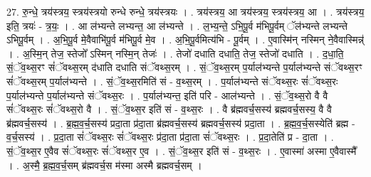 \documentclass[17pt]{extarticle}
\begin{document}
27. रु॒न्धे॒ त्रय॑स्त्रय॒ स्त्रय॑स्त्रयो रुन्धे रुन्धे॒ त्रय॑स्त्रयः । . त्रय॑स्त्रय॒ आ त्रय॑स्त्रय॒ स्त्रय॑स्त्रय॒ आ । . त्रय॑स्त्रय॒ इति॒ त्रयः॑ - त्र॒यः॒ । . आ ल॑भ्यन्ते लभ्यन्त॒ आ ल॑भ्यन्ते । . ल॒भ्य॒न्ते॒ ऽभि॒पू॒र्व म॑भिपू॒र्वम् ॅल॑भ्यन्ते लभ्यन्ते ऽभिपू॒र्वम् । . अ॒भि॒पू॒र्व मे॒वैवाभि॑पू॒र्व म॑भिपू॒र्व मे॒व । . अ॒भि॒पू॒र्वमित्य॑भि - पू॒र्वम् । . ए॒वास्मि॑न् नस्मिन् ने॒वैवास्मिन्न्॑ । . अ॒स्मि॒न् तेज॒ स्तेजो᳚ ऽस्मिन् नस्मि॒न् तेजः॑ । . तेजो॑ दधाति दधाति॒ तेज॒ स्तेजो॑ दधाति । . द॒धा॒ति॒ सं॒ॅव॒थ्स॒रꣳ सं॑ॅवथ्स॒रम् द॑धाति दधाति संॅवथ्स॒रम् । . सं॒ॅव॒थ्स॒रम् प॒र्याल॑भ्यन्ते प॒र्याल॑भ्यन्ते संॅवथ्स॒रꣳ सं॑ॅवथ्स॒रम् प॒र्याल॑भ्यन्ते । . सं॒ॅव॒थ्स॒रमिति॑ सं - व॒थ्स॒रम् । . प॒र्याल॑भ्यन्ते संॅवथ्स॒रः सं॑ॅवथ्स॒रः प॒र्याल॑भ्यन्ते प॒र्याल॑भ्यन्ते संॅवथ्स॒रः । . प॒र्याल॑भ्यन्त॒ इति॑ परि - आल॑भ्यन्ते । . सं॒ॅव॒थ्स॒रो वै वै सं॑ॅवथ्स॒रः सं॑ॅवथ्स॒रो वै । . सं॒ॅव॒थ्स॒र इति॑ सं - व॒थ्स॒रः । . वै ब्र॑ह्मवर्च॒सस्य॑ ब्रह्मवर्च॒सस्य॒ वै वै ब्र॑ह्मवर्च॒सस्य॑ । . ब्र॒ह्म॒व॒र्च॒सस्य॑ प्रदा॒ता प्र॑दा॒ता ब्र॑ह्मवर्च॒सस्य॑ ब्रह्मवर्च॒सस्य॑ प्रदा॒ता । . ब्र॒ह्म॒व॒र्च॒सस्येति॑ ब्रह्म - व॒र्च॒सस्य॑ । . प्र॒दा॒ता सं॑ॅवथ्स॒रः सं॑ॅवथ्स॒रः प्र॑दा॒ता प्र॑दा॒ता सं॑ॅवथ्स॒रः । . प्र॒दा॒तेति॑ प्र - दा॒ता । . सं॒ॅव॒थ्स॒र ए॒वैव सं॑ॅवथ्स॒रः सं॑ॅवथ्स॒र ए॒व । . सं॒ॅव॒थ्स॒र इति॑ सं - व॒थ्स॒रः । . ए॒वास्मा॑ अस्मा ए॒वैवास्मै᳚ । . अ॒स्मै॒ ब्र॒ह्म॒व॒र्च॒सम् ब्र॑ह्मवर्च॒स म॑स्मा अस्मै ब्रह्मवर्च॒सम् । \newline
\end{document}
